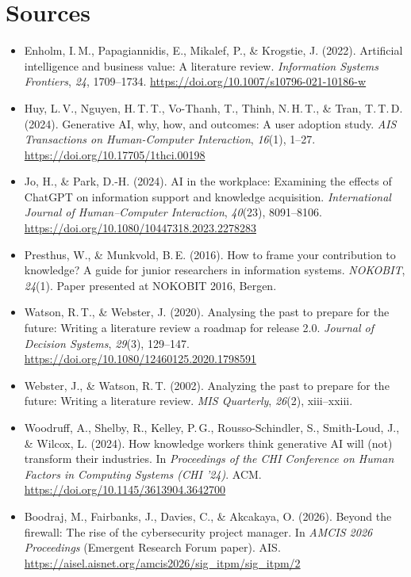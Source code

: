 \documentclass[11pt,a4paper,british,twoside=false,headings=small,chapterprefix=false,numbers=noenddot]{scrbook}
\begin{document}
\section*{Sources}
\begin{itemize}\small
  \item Enholm, I.\,M., Papagiannidis, E., Mikalef, P., \& Krogstie, J. (2022). Artificial intelligence and business value: A literature review. \emph{Information Systems Frontiers}, \emph{24}, 1709--1734. \url{https://doi.org/10.1007/s10796-021-10186-w}
  \item Huy, L.\,V., Nguyen, H.\,T.\,T., Vo-Thanh, T., Thinh, N.\,H.\,T., \& Tran, T.\,T.\,D. (2024). Generative AI, why, how, and outcomes: A user adoption study. \emph{AIS Transactions on Human-Computer Interaction}, \emph{16}(1), 1--27. \url{https://doi.org/10.17705/1thci.00198}
  \item Jo, H., \& Park, D.-H. (2024). AI in the workplace: Examining the effects of ChatGPT on information support and knowledge acquisition. \emph{International Journal of Human--Computer Interaction}, \emph{40}(23), 8091--8106. \url{https://doi.org/10.1080/10447318.2023.2278283}
  \item Presthus, W., \& Munkvold, B.\,E. (2016). How to frame your contribution to knowledge? A guide for junior researchers in information systems. \emph{NOKOBIT}, \emph{24}(1). Paper presented at NOKOBIT 2016, Bergen.
  \item Watson, R.\,T., \& Webster, J. (2020). Analysing the past to prepare for the future: Writing a literature review a roadmap for release 2.0. \emph{Journal of Decision Systems}, \emph{29}(3), 129--147. \url{https://doi.org/10.1080/12460125.2020.1798591}
  \item Webster, J., \& Watson, R.\,T. (2002). Analyzing the past to prepare for the future: Writing a literature review. \emph{MIS Quarterly}, \emph{26}(2), xiii--xxiii.
  \item Woodruff, A., Shelby, R., Kelley, P.\,G., Rousso-Schindler, S., Smith-Loud, J., \& Wilcox, L. (2024). How knowledge workers think generative AI will (not) transform their industries. In \emph{Proceedings of the CHI Conference on Human Factors in Computing Systems (CHI '24)}. ACM. \url{https://doi.org/10.1145/3613904.3642700}
  \item Boodraj, M., Fairbanks, J., Davies, C., \& Akcakaya, O. (2026). Beyond the firewall: The rise of the cybersecurity project manager. In \emph{AMCIS 2026 Proceedings} (Emergent Research Forum paper). AIS. \url{https://aisel.aisnet.org/amcis2026/sig_itpm/sig_itpm/2}

\end{itemize}
\end{document}
